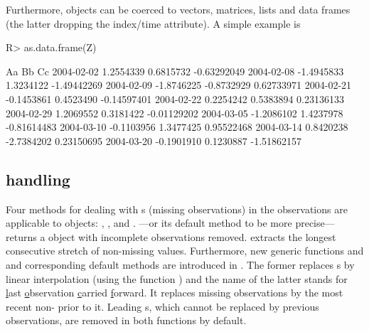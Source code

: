 \documentclass[article,nojss]{jss}
\begin{document}
Furthermore,  objects can be coerced to vectors, matrices, lists and
data frames (the latter dropping the index/time attribute). A simple example is
\begin{Schunk}
\begin{Sinput}
R> as.data.frame(Z)
\end{Sinput}
\begin{Soutput}
                   Aa         Bb          Cc
2004-02-02  1.2554339  0.6815732 -0.63292049
2004-02-08 -1.4945833  1.3234122 -1.49442269
2004-02-09 -1.8746225 -0.8732929  0.62733971
2004-02-21 -0.1453861  0.4523490 -0.14597401
2004-02-22  0.2254242  0.5383894  0.23136133
2004-02-29  1.2069552  0.3181422 -0.01129202
2004-03-05 -1.2086102  1.4237978 -0.81614483
2004-03-10 -0.1103956  1.3477425  0.95522468
2004-03-14  0.8420238 -2.7384202  0.23150695
2004-03-20 -0.1901910  0.1230887 -1.51862157
\end{Soutput}
\end{Schunk}


\subsection[NA handling]{ handling}
\label{sec:NA}

Four methods for dealing with s (missing observations) 
in the observations are applicable to  objects:
, ,  and .
---or its default method to be more precise---returns a 
object with incomplete observations removed. 
extracts the longest consecutive stretch of non-missing values.
Furthermore, new generic functions
 and  and corresponding default methods are introduced in .
The former replaces s by linear interpolation (using the
function ) and the name of the latter
stands for \underline{l}ast \underline{o}bservation \underline{c}arried
\underline{f}orward. It replaces missing observations by the most recent
non- prior to it. Leading s, which cannot be replaced
by previous observations, are removed in both functions by default.
\end{document}
